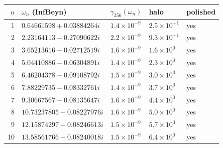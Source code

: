 \begin{tabular}{rllll}
\toprule
$n$ & $\omega_n$ (InfBeyn) & $\gamma_{256}(\omega_n)$ & halo & polished\\
\midrule
1 & $0.64661598+0.03884264i$ & $1.4\times10^{-9}$ & $2.5\times10^{-1}$ & yes\\
2 & $2.23164113-0.27090622i$ & $2.2\times10^{-9}$ & $9.3\times10^{-1}$ & yes\\
3 & $3.65213616-0.02712519i$ & $1.6\times10^{-9}$ & $1.6\times10^{0}$ & yes\\
4 & $5.04410886-0.06304891i$ & $1.4\times10^{-9}$ & $2.3\times10^{0}$ & yes\\
5 & $6.46204378-0.09108792i$ & $1.5\times10^{-9}$ & $3.0\times10^{0}$ & yes\\
6 & $7.88229735-0.08332761i$ & $1.4\times10^{-9}$ & $3.7\times10^{0}$ & yes\\
7 & $9.30667567-0.08135647i$ & $1.6\times10^{-9}$ & $4.4\times10^{0}$ & yes\\
8 & $10.73237805-0.08227976i$ & $1.6\times10^{-9}$ & $5.0\times10^{0}$ & yes\\
9 & $12.15874297-0.08246613i$ & $1.5\times10^{-9}$ & $5.7\times10^{0}$ & yes\\
10 & $13.58561766-0.08240018i$ & $1.5\times10^{-9}$ & $6.4\times10^{0}$ & yes\\
\bottomrule
\end{tabular}
